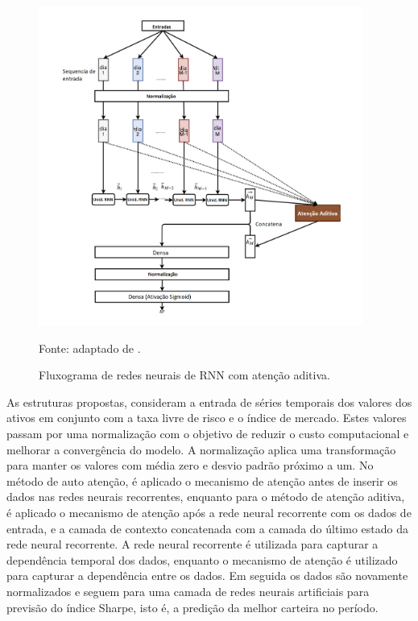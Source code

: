         \begin{figure}[H]
            \centering
            \caption{Fluxograma de redes neurais de RNN com atenção aditiva.}
            \label{fig:RNN_BauhAtt}
            \includegraphics[width=0.95\textwidth]{./imagens/RNN_AddAtt.png}
            \par \footnotesize Fonte: adaptado de .
        \end{figure}

        \ipar As estruturas propostas, consideram a entrada de séries temporais dos valores dos ativos em conjunto com a taxa livre de risco e o índice de mercado. Estes valores passam por uma normalização com o objetivo de reduzir o custo computacional e melhorar a convergência do modelo. A normalização aplica uma transformação para manter os valores com média zero e desvio padrão próximo a um. No método de auto atenção, é aplicado o mecanismo de atenção antes de inserir os dados nas redes neurais recorrentes, enquanto para o método de atenção aditiva, é aplicado o mecanismo de atenção após a rede neural recorrente com os dados de entrada, e a camada de contexto concatenada com a camada do último estado da rede neural recorrente. A rede neural recorrente é utilizada para capturar a dependência temporal dos dados, enquanto o mecanismo de atenção é utilizado para capturar a dependência entre os dados. Em seguida os dados são novamente normalizados e seguem para uma camada de redes neurais artificiais para previsão do índice Sharpe, isto é, a predição da melhor carteira no período. 
        

